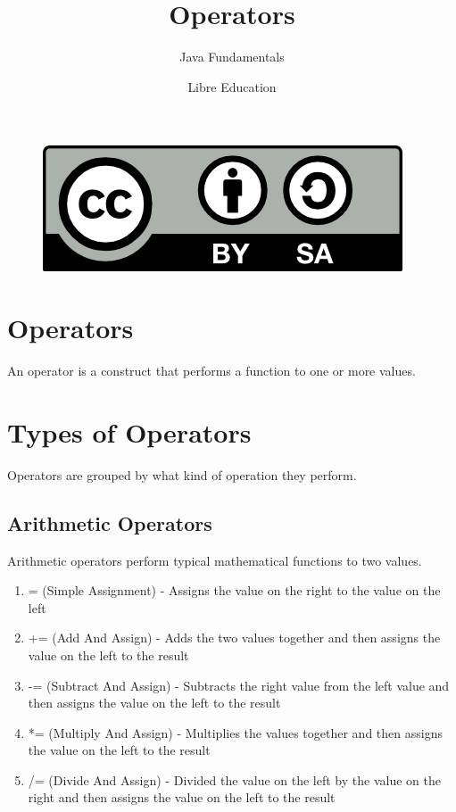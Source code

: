 \documentclass[a4paper]{article}
\title{Operators}
\subtitle{Java Fundamentals}
\date{}
\author{Libre Education}
\begin{document}
\maketitle


\begin{figure}[b]
\includegraphics{BY-SA}
\centering
\end{figure}

\newpage

\section*{Operators}

An operator is a construct that performs a function to one or more values.

\section*{Types of Operators}
Operators are grouped by what kind of operation they perform.

\subsection*{Arithmetic Operators}
Arithmetic operators perform typical mathematical functions to two values.
\begin{enumerate}

\item = (Simple Assignment) - Assigns the value on the right to the value on the
left

\item += (Add And Assign) - Adds the two values together and then assigns the
value on the left to the result

\item -= (Subtract And Assign) - Subtracts the right value from the left value
and then assigns the value on the left to the result

\item *= (Multiply And Assign) - Multiplies the values together and then assigns
the value on the left to the result

\item /= (Divide And Assign) - Divided the value on the left by the value on the
right and then assigns the value on the left to the result

\end{enumerate}
\end{document}
